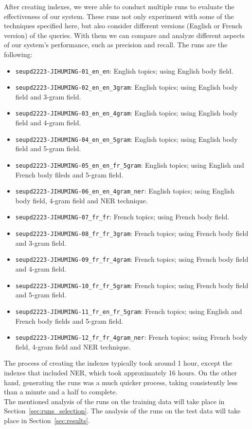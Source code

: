 After creating indexes, we were able to conduct multiple runs to evaluate the effectiveness of our system.
These runs not only experiment with some of the techniques specified here, but also consider different versions (English
or French version) of the queries.
With them we can compare and analyze different aspects of our system's performance, such as precision and recall.
The runs are the following:
\begin{itemize}
	\item \texttt{seupd2223-JIHUMING-01\_en\_en}: English topics; using English body field.
	\item \texttt{seupd2223-JIHUMING-02\_en\_en\_3gram}: English topics; using English body field and 3-gram field.
	\item \texttt{seupd2223-JIHUMING-03\_en\_en\_4gram}: English topics; using English body field and 4-gram field.
	\item \texttt{seupd2223-JIHUMING-04\_en\_en\_5gram}: English topics; using English body field and 5-gram field.
	\item \texttt{seupd2223-JIHUMING-05\_en\_en\_fr\_5gram}: English topics; using English and French body fileds and 5-gram field.
	\item \texttt{seupd2223-JIHUMING-06\_en\_en\_4gram\_ner}: English topics; using English body field, 4-gram field and NER technique.
	\item \texttt{seupd2223-JIHUMING-07\_fr\_fr}: French topics; using French body field.
	\item \texttt{seupd2223-JIHUMING-08\_fr\_fr\_3gram}: French topics; using French body field and 3-gram field.
	\item \texttt{seupd2223-JIHUMING-09\_fr\_fr\_4gram}: French topics; using French body field and 4-gram field.
	\item \texttt{seupd2223-JIHUMING-10\_fr\_fr\_5gram}: French topics; using French body field and 5-gram field.
	\item \texttt{seupd2223-JIHUMING-11\_fr\_en\_fr\_5gram}: French topics; using English and French body fields and 5-gram field.
	\item \texttt{seupd2223-JIHUMING-12\_fr\_fr\_4gram\_ner}: French topics; using French body field, 4-gram field and NER technique.
\end{itemize}

The process of creating the indexes typically took around 1 hour, except the indexes that included NER, which took
approximately 16 hours.
On the other hand, generating the runs was a much quicker process, taking consistently less than a minute and a half to
complete.\\

The mentioned analysis of the runs on the training data will take place in Section~\ref{sec:runs_selection}.
The analysis of the runs on the test data will take place in Section~\ref{sec:results}.